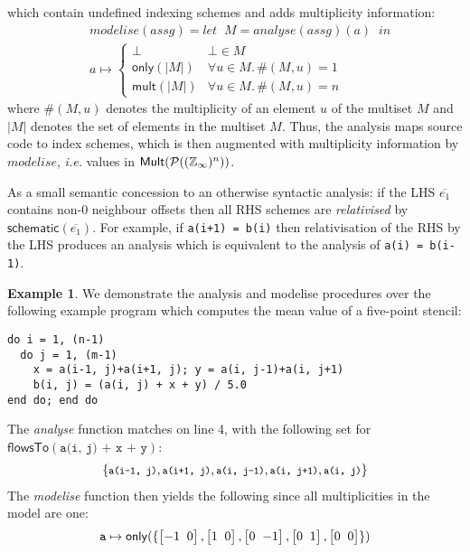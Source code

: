 \documentclass[10pt,preprint,numbers]{sigplanconf}
\newcounter{block}
\theoremstyle{definition}
\newtheorem{example}[block]{Example}
\newcommand{\ie}{\emph{i.e.}}
\newcommand{\vtwoh}[2]{\setlength{\arraycolsep}{0em}
\left[\begin{array}{cc}#1 \; & \; #2\end{array}\right]}
\begin{document}
which contain undefined indexing schemes and adds multiplicity
information:
%
\begin{align*}
& \mathit{modelise} (\textit{assg})
= \textit{let} \;\; M = \mathit{analyse}(\textit{assg}) (a) \;\; \textit{in}
\\
& a \mapsto
\begin{cases}
\bot & \bot \in M \\
\textsf{only}(|M|) & \forall u \in M . \, \#(M, u) = 1 \\
\textsf{mult}(|M|) & \forall u \in M . \, \#(M, u) = n
\end{cases}
\end{align*}
where $\#(M, u)$ denotes the multiplicity of an element $u$ of the
multiset $M$ and $|M|$ denotes the set of elements in the multiset
$M$.
Thus, the analysis maps source code to index schemes, which is then
augmented with multiplicity information by $\mathit{modelise}$,
\ie{} values in $\mathsf{Mult}(\mathcal{P}((\mathbb{Z}_\infty{})^n))$.

As a small semantic concession to an otherwise syntactic
analysis: if the LHS $\overline{e_1}$ contains non-$0$ neighbour offsets
then all RHS schemes are \emph{relativised} by
$\textsf{schematic}(\overline{e_1})$. For example,
if \texttt{a(i+1) = b(i)} then relativisation of the RHS by the LHS
produces an analysis which is equivalent to the analysis of \texttt{a(i) = b(i-1)}.

\begin{example}
\label{exm:checking}
We demonstrate the analysis and modelise procedures over the
following example program which computes the mean value
of a five-point stencil:
\begin{verbatim}
do i = 1, (n-1)
  do j = 1, (m-1)
    x = a(i-1, j)+a(i+1, j); y = a(i, j-1)+a(i, j+1)
    b(i, j) = (a(i, j) + x + y) / 5.0
end do; end do
\end{verbatim}
%
The \textit{analyse} function matches on
line 4, with the following set for $\textsf{flowsTo}(\texttt{a(i, j) + x +
  y})$:
%
\begin{align*}
{\small{
\{\texttt{a(i-1, j)}, \texttt{a(i+1, j)}, \texttt{a(i, j-1)},
  \texttt{a(i, j+1)}, \texttt{a(i, j)}\}}}
\end{align*}
The \emph{modelise} function then yields the following
since all multiplicities in the model are one:
\begin{align*}
\texttt{a} \mapsto \mathsf{only}(\{\vtwoh{-1}{0}, \vtwoh{1}{0},
          \vtwoh{0}{-1}, \vtwoh{0}{1}, \vtwoh{0}{0}\})
\end{align*}
\end{example}
\end{document}
